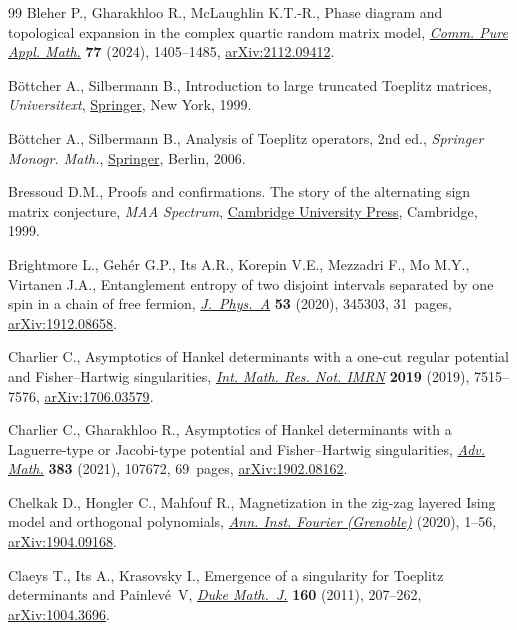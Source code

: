 \documentclass[10pt,a4paper]{amsart}
\numberwithin{equation}{section}
\begin{document}
\begin{thebibliography}{99}
Bleher P., Gharakhloo R., McLaughlin K.T.-R., Phase diagram and topological
 expansion in the complex quartic random matrix model, \href{https://doi.org/10.1002/cpa.22164}{\textit{Comm. Pure
 Appl. Math.}} \textbf{77} (2024), 1405--1485, \href{https://arxiv.org/abs/2112.09412}{arXiv:2112.09412}.

B\"ottcher A., Silbermann B., Introduction to large truncated {T}oeplitz
 matrices, \textit{Universitext}, \href{https://doi.org/10.1007/978-1-4612-1426-7}{Springer}, New York, 1999.

B\"ottcher A., Silbermann B., Analysis of {T}oeplitz operators, 2nd ed.,
 \textit{Springer Monogr. Math.}, \href{https://doi.org/10.1007/3-540-32436-4}{Springer}, Berlin, 2006.

Bressoud D.M., Proofs and confirmations. The story of the alternating sign
 matrix conjecture, \textit{MAA Spectrum}, \href{https://doi.org/10.1017/CBO9780511613449}{Cambridge University Press}, Cambridge, 1999.

Brightmore L., Geh\'er G.P., Its A.R., Korepin V.E., Mezzadri F., Mo M.Y.,
 Virtanen J.A., Entanglement entropy of two disjoint intervals separated by
 one spin in a chain of free fermion, \href{https://doi.org/10.1088/1751-8121/ab9cf2}{\textit{J.~Phys.~A}} \textbf{53} (2020),
 345303, 31~pages, \href{https://arxiv.org/abs/1912.08658}{arXiv:1912.08658}.

Charlier C., Asymptotics of {H}ankel determinants with a one-cut regular
 potential and {F}isher--{H}artwig singularities, \href{https://doi.org/10.1093/imrn/rny009}{\textit{Int. Math. Res. Not.
 IMRN}} \textbf{2019} (2019), 7515--7576, \href{https://arxiv.org/abs/1706.03579}{arXiv:1706.03579}.

Charlier C., Gharakhloo R., Asymptotics of {H}ankel determinants with a
 {L}aguerre-type or {J}acobi-type potential and {F}isher--{H}artwig
 singularities, \href{https://doi.org/10.1016/j.aim.2021.107672}{\textit{Adv. Math.}} \textbf{383} (2021), 107672, 69~pages,
 \href{https://arxiv.org/abs/1902.08162}{arXiv:1902.08162}.

Chelkak D., Hongler C., Mahfouf R., Magnetization in the zig-zag layered
 {I}sing model and orthogonal polynomials, \href{https://doi.org/10.5802/aif.3605}{\textit{Ann. Inst. Fourier
 (Grenoble)}} (2020), 1--56, \href{https://arxiv.org/abs/1904.09168}{arXiv:1904.09168}.

Claeys T., Its A., Krasovsky I., Emergence of a singularity for {T}oeplitz
 determinants and {P}ainlev\'e~{V}, \href{https://doi.org/10.1215/00127094-1444207}{\textit{Duke Math.~J.}} \textbf{160}
 (2011), 207--262, \href{https://arxiv.org/abs/1004.3696}{arXiv:1004.3696}.


\end{thebibliography}
\end{document}
